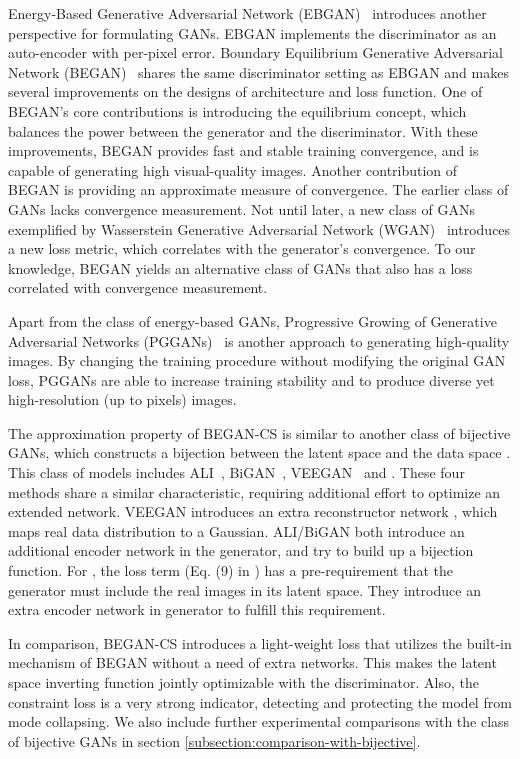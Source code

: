 \documentclass[runningheads]{llncs}
\begin{document}
    Energy-Based Generative Adversarial Network (EBGAN)~\cite{EBGAN} introduces another perspective for formulating GANs. EBGAN implements the discriminator as an auto-encoder with per-pixel error. Boundary Equilibrium Generative Adversarial Network (BEGAN)~\cite{BEGAN} shares the same discriminator setting as EBGAN and makes several improvements on the designs of architecture and loss function. One of BEGAN's core contributions is introducing the equilibrium concept, which balances the power between the generator and the discriminator. With these improvements, BEGAN provides fast and stable training convergence, and is capable of generating high visual-quality images. Another contribution of BEGAN is providing an approximate measure of convergence. The earlier class of GANs lacks convergence measurement. Not until later, a new class of GANs exemplified by Wasserstein Generative Adversarial Network (WGAN)~\cite{WGAN} introduces a new loss metric, which correlates with the generator’s convergence. To our knowledge, BEGAN yields an alternative class of GANs that also has a loss correlated with convergence measurement.

    Apart from the class of energy-based GANs, Progressive Growing of Generative Adversarial Networks (PGGANs)~\cite{PGGAN} is another approach to generating high-quality images. By changing the training procedure without modifying the original GAN loss, PGGANs are able to increase training stability and to produce diverse yet high-resolution (up to  pixels) images.
    
    
    The  approximation property of BEGAN-CS is similar to another class of bijective GANs, which constructs a bijection between the latent space  and the data space . This class of models includes ALI~\cite{DumoulinBPLAMC16}, BiGAN~\cite{DonahueKD16}, VEEGAN~\cite{SrivastavaVRGS17} and \cite{reviewer_paper_A}. These four methods share a similar characteristic, requiring additional effort to optimize an extended network. VEEGAN introduces an extra reconstructor network , which maps real data distribution  to a Gaussian. ALI/BiGAN both introduce an additional encoder network in the generator, and try to build up a bijection function. For \cite{reviewer_paper_A}, the loss term  (Eq. (9) in \cite{reviewer_paper_A}) has a pre-requirement that the generator must include the real images in its latent space. They introduce an extra encoder network in generator to fulfill this requirement.
    
    
    In comparison, BEGAN-CS introduces a light-weight loss that utilizes the built-in mechanism of BEGAN without a need of extra networks. This makes the latent space inverting function jointly optimizable with the discriminator. Also, the constraint loss is a very strong indicator, detecting and protecting the model from mode collapsing. We also include further experimental comparisons with the class of bijective GANs in section \ref{subsection:comparison-with-bijective}.
    
\end{document}
